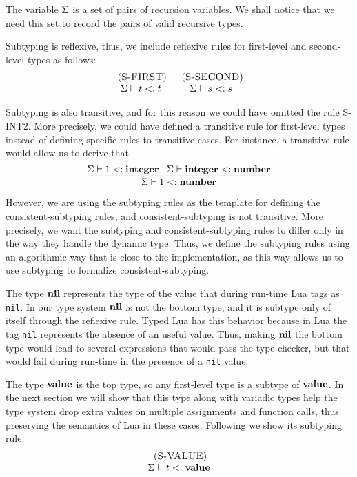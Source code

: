 The variable $\Sigma$ is a set of pairs of recursion variables.
We shall notice that we need this set to record the pairs of valid
recursive types.

Subtyping is reflexive, thus, we include reflexive rules for
first-level and second-level types as follows:
\[
\begin{array}{c}
\begin{array}{c}
\; (\textsc{S-FIRST})\\
\Sigma \vdash t <: t
\end{array}
\;
\begin{array}{c}
\; (\textsc{S-SECOND})\\
\Sigma \vdash s <: s
\end{array}
\end{array}
\]

Subtyping is also transitive, and for this reason we could have omitted
the rule \textsc{S-INT2}.
More precisely, we could have defined a transitive rule for first-level
types instead of defining specific rules to transitive cases.
For instance, a transitive rule would allow us to derive that
\[
\dfrac{\Sigma \vdash 1 <: \mathbf{integer} \;\;\;
       \Sigma \vdash \mathbf{integer} <: \mathbf{number}}
      {\Sigma \vdash 1 <: \mathbf{number}}
\]

However, we are using the subtyping rules as the template for defining
the consistent-subtyping rules, and consistent-subtyping is not
transitive.
More precisely, we want the subtyping and consistent-subtyping rules
to differ only in the way they handle the dynamic type.
Thus, we define the subtyping rules using an algorithmic
way that is close to the implementation, as this way allows us to use
subtyping to formalize consistent-subtyping.

The type $\mathbf{nil}$ represents the type of the value that during run-time
Lua tags as \texttt{nil}.
In our type system $\mathbf{nil}$ is not the bottom type, and it is subtype
only of itself through the reflexive rule.
Typed Lua has this behavior because in Lua the tag \texttt{nil}
represents the absence of an useful value.
Thus, making $\mathbf{nil}$ the bottom type would lead to several expressions
that would pass the type checker, but that would fail during run-time
in the presence of a \texttt{nil} value.

The type $\mathbf{value}$ is the top type, so any first-level type is a
subtype of $\mathbf{value}$.
In the next section we will show that this type along with
variadic types help the type system drop extra values on
multiple assignments and function calls, thus preserving the
semantics of Lua in these cases.
Following we show its subtyping rule:
\[
\begin{array}{c}
\; (\textsc{S-VALUE})\\
\Sigma \vdash t <: \mathbf{value}
\end{array}
\]

